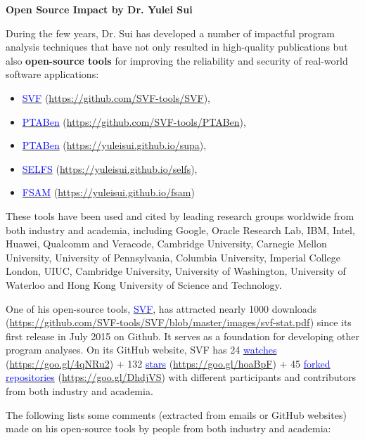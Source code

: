 \documentclass[12pt]{article}
\begin{document}
\centerline{\Large \bf Open Source Impact by Dr. Yulei Sui}
\bigskip
\bigskip

During the few years, Dr. Sui has 
developed a number of impactful 
program analysis techniques that have not only 
resulted in high-quality publications but also 
\textbf{open-source tools} for improving the reliability
and security of real-world software applications:
\begin{itemize}
\setlength\itemsep{-0.2em}
\item \href{https://github.com/SVF-tools/SVF}{\textcolor{blue}{SVF}} (\url{https://github.com/SVF-tools/SVF}), 
\item \href{https://github.com/SVF-tools/PTABen}{\textcolor{blue}{PTABen}} (\url{https://github.com/SVF-tools/PTABen}), 
\item \href{https://yuleisui.github.io/supa}{\textcolor{blue}{PTABen}} (\url{https://yuleisui.github.io/supa}), 
\item \href{https://yuleisui.github.io/selfs}{\textcolor{blue}{SELFS}} (\url{https://yuleisui.github.io/selfs}), 
\item \href{https://yuleisui.github.io/fsam}{\textcolor{blue}{FSAM}} (\url{https://yuleisui.github.io/fsam}) 
\end{itemize}
These tools have been used and cited by leading research groups worldwide from both industry and academia, including Google, Oracle Research Lab, IBM, Intel, Huawei, Qualcomm and Veracode, Cambridge University, Carnegie Mellon University, University of Pennsylvania, Columbia University, Imperial College London, UIUC, Cambridge University, University of Washington, University of Waterloo and Hong Kong University of Science and Technology.


One of his open-source tools, \href{https://github.com/SVF-tools/SVF}{\textcolor{blue}{SVF}}, has attracted nearly 1000 downloads (\url{https://github.com/SVF-tools/SVF/blob/master/images/svf-stat.pdf}) since its first release in July 2015 on Github. 
It serves as a foundation for developing other
program analyses. On its GitHub website, SVF  has 24 \href{https://goo.gl/4qNRu2}{\textcolor{blue}{watches}} (\url{https://goo.gl/4qNRu2}) + 132 \href{https://goo.gl/hoaBpF}{\textcolor{blue}{stars}} (\url{https://goo.gl/hoaBpF}) + 45 \href{https://goo.gl/w1gjKB}{\textcolor{blue}{forked repositories}} (\url{https://goo.gl/DhdjVS}) with different participants and contributors from both industry and academia.

The following lists some comments (extracted from emails or GitHub websites) made on his open-source tools by people from both industry and academia:
\end{document}
